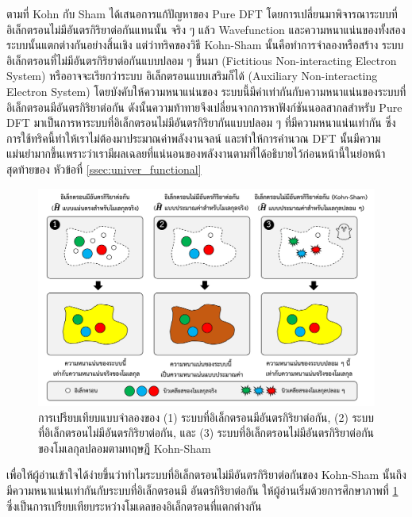 ตามที่ Kohn กับ Sham ได้เสนอการแก้ปัญหาของ Pure DFT โดยการเปลี่ยนมาพิจารณาระบบที่อิเล็กตรอนไม่มีอันตรกิริยาต่อกันแทนนั้น จริง ๆ
แล้ว Wavefunction และความหนาแน่นของทั้งสองระบบนั้นแตกต่างกันอย่างสิ้นเชิง แต่ว่าทริคของวิธี Kohn-Sham นั้นคือทำการจำลองหรือสร้าง%
ระบบอิเล็กตรอนที่ไม่มีอันตรกิริยาต่อกันแบบปลอม ๆ ขึ้นมา (Fictitious Non-interacting Electron System) หรืออาจจะเรียกว่าระบบ%
อิเล็กตรอนแบบเสริมก็ได้ (Auxiliary Non-interacting Electron System)\autocite{martin2020} โดยบังคับให้ความหนาแน่นของ%
ระบบนี้มีค่าเท่ากันกับความหนาแน่นของระบบที่อิเล็กตรอนมีอันตรกิริยาต่อกัน ดังนั้นความท้าทายจึงเปลี่ยนจากการหาฟังก์ชันนอลสากลสำหรับ Pure DFT
มาเป็นการหาระบบที่อิเล็กตรอนไม่มีอันตรกิริยากันแบบปลอม ๆ ที่มีความหนาแน่นเท่ากัน ซึ่งการใช้ทริคนี้ทำให้เราไม่ต้องมาประมาณค่าพลังงานจลน์%
และทำให้การคำนวณ DFT นั้นมีความแม่นยำมากขึ้นเพราะว่าเรามีผลเฉลยที่แน่นอนของพลังงานตามที่ได้อธิบายไว้ก่อนหน้านี้ในย่อหน้าสุดท้ายของ%
หัวข้อที่ \ref{ssec:univer_functional}

\begin{figure}[H]
    \centering
    \includegraphics[width=\linewidth]{fig/electron_system.png}
    \caption{การเปรียบเทียบแบบจำลองของ (1) ระบบที่อิเล็กตรอนมีอันตรกิริยาต่อกัน, (2) ระบบที่อิเล็กตรอนไม่มีอันตรกิริยาต่อกัน, และ
        (3) ระบบที่อิเล็กตรอนไม่มีอันตรกิริยาต่อกันของโมเลกุลปลอมตามทฤษฎี Kohn-Sham}
    \label{fig:electron_system}
\end{figure}

เพื่อให้ผู้อ่านเข้าใจได้ง่ายขึ้นว่าทำไมระบบที่อิเล็กตรอนไม่มีอันตรกิริยาต่อกันของ Kohn-Sham นั้นถึงมีความหนาแน่นเท่ากันกับระบบที่อิเล็กตรอนมี%
อันตรกิริยาต่อกัน ให้ผู้อ่านเริ่มด้วยการศึกษาภาพที่ \ref{fig:electron_system} ซึ่งเป็นการเปรียบเทียบระหว่างโมเดลของอิเล็กตรอนที่แตกต่างกัน

